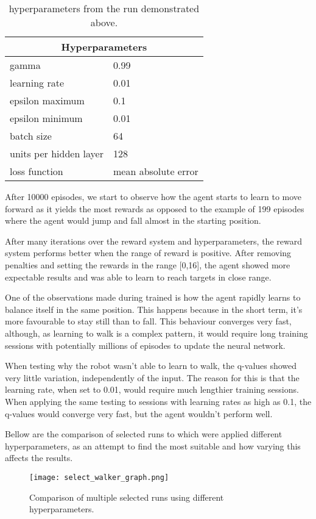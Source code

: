 \begin{table}[H]
 \centering
 \caption{hyperparameters from the run demonstrated above.}
 \begin{tabular}{|ll|}
 \hline
 \multicolumn{2}{|c|}{Hyperparameters} \\ \hline
 \multicolumn{1}{|l|}{gamma} & 0.99 \\ \hline
 \multicolumn{1}{|l|}{learning rate} & 0.01 \\ \hline
 \multicolumn{1}{|l|}{epsilon maximum} & 0.1 \\ \hline
 \multicolumn{1}{|l|}{epsilon minimum} & 0.01 \\ \hline
 \multicolumn{1}{|l|}{batch size} & 64 \\ \hline
 \multicolumn{1}{|l|}{units per hidden layer} & 128 \\ \hline
 \multicolumn{1}{|l|}{loss function} & mean absolute error \\ \hline
 \end{tabular}
\end{table}
After 10000 episodes, we start to observe how the agent starts to learn to move forward as it yields the most rewards as opposed to the example of 199 episodes where the agent would jump and fall almost in the starting position.

After many iterations over the reward system and hyperparameters, the reward system performs better when the range of reward is positive. After removing penalties and setting the rewards in the range [0,16], the agent showed more expectable results and was able to learn to reach targets in close range.

One of the observations made during trained is how the agent rapidly learns to balance itself in the same position. This happens because in the short term, it's more favourable to stay still than to fall. This behaviour converges very fast, although, as learning to walk is a complex pattern, it would require long training sessions with potentially millions of episodes to update the neural network.

When testing why the robot wasn't able to learn to walk, the q-values showed very little variation, independently of the input. The reason for this is that the learning rate, when set to 0.01, would require much lengthier training sessions. When applying the same testing to sessions with learning rates as high as 0.1, the q-values would converge very fast, but the agent wouldn't perform well.

Bellow are the comparison of selected runs to which were applied different hyperparameters, as an attempt to find the most suitable and how varying this affects the results.
\begin{figure}[H]
 \centering
 \texttt{[image: select\_walker\_graph.png]}
 \caption{Comparison of multiple selected runs using different hyperparameters.}
\end{figure}

